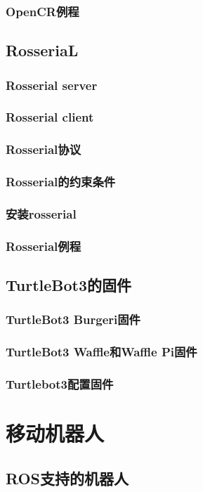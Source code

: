 \documentclass[geye,green,kindle,cn]{elegantnote}
\begin{document}
\subsubsection{OpenCR例程}
\subsection{RosseriaL}
\subsubsection{Rosserial server}
\subsubsection{Rosserial client}
\subsubsection{Rosserial协议}
\subsubsection{Rosserial的约束条件}
\subsubsection{安装rosserial}
\subsubsection{Rosserial例程}
\subsection{TurtleBot3的固件}
\subsubsection{TurtleBot3 Burgeri固件}
\subsubsection{TurtleBot3 Waffle和Waffle Pi固件}
\subsubsection{Turtlebot3配置固件}
\section{移动机器人}
\subsection{ROS支持的机器人}
\end{document}
